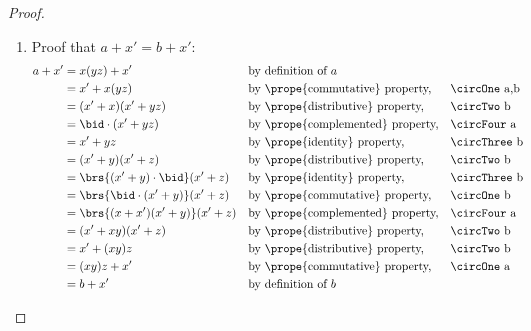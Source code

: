 \begin{proof}
\begin{enumerate}
\begin{enumerate}
            \item Proof that $a+x'=b+x'$: \label{item:boo_H1c_axpbxp}
              \begin{align*}
                a + x'
                  &= x(yz) + x'
                  && \text{by definition of $a$}
                \\&= x' + x(yz)
                  && \text{by \prope{commutative} property,}
                  && \text{\circOne a,b}
                \\&= (x' + x)(x'+yz)
                  && \text{by \prope{distributive} property,}
                  && \text{\circTwo b}
                \\&= \bid\cdot(x'+yz)
                  && \text{by \prope{complemented} property,}
                  && \text{\circFour a}
                \\&= x'+yz
                  && \text{by \prope{identity} property,}
                  && \text{\circThree b}
                \\&= (x'+y)(x'+z)
                  && \text{by \prope{distributive} property,}
                  && \text{\circTwo b}
                \\&= \brs{(x'+y)\cdot\bid}(x'+z)
                  && \text{by \prope{identity} property,}
                  && \text{\circThree b}
                \\&= \brs{\bid\cdot(x'+y)}(x'+z)
                  && \text{by \prope{commutative} property,}
                  && \text{\circOne b}
                \\&= \brs{(x+x')(x'+y)}(x'+z)
                  && \text{by \prope{complemented} property,}
                  && \text{\circFour a}
                \\&= (x'+xy)(x'+z)
                  && \text{by \prope{distributive} property,}
                  && \text{\circTwo b}
                \\&= x'+(xy)z
                  && \text{by \prope{distributive} property,}
                  && \text{\circTwo b}
                \\&= (xy)z+x'
                  && \text{by \prope{commutative} property,}
                  && \text{\circOne a}
                \\&= b+x'
                  && \text{by definition of $b$}
              \end{align*}


\end{enumerate}
\end{enumerate}
\end{proof}
